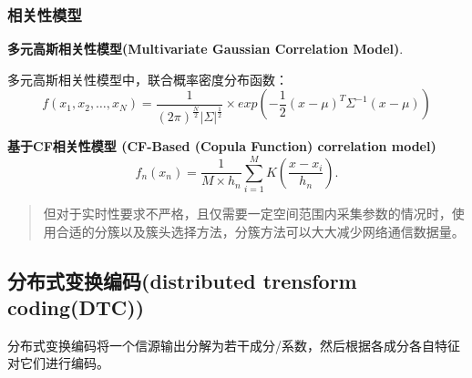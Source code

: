 \subsubsection{相关性模型}
\textbf{多元高斯相关性模型(Multivariate Gaussian Correlation Model)}.

多元高斯相关性模型中，联合概率密度分布函数：
\begin{equation}
    f(x_1,x_2,\dots,x_N) = \dfrac{1}{(2\pi)^{\frac{N}{2}}|\Sigma|^{\frac{1}{2}}} \times exp\left( -\dfrac{1}{2} (x-\mu)^T \Sigma^{-1}(x-\mu) \right)
    \label{eq1.4}
\end{equation}

\textbf{基于CF相关性模型 (CF-Based (Copula Function) correlation model)}
\begin{equation}
    f_n(x_n) = \dfrac{1}{M \times h_n} \sum_{i=1}^{M}K\left( \dfrac{x-x_i}{h_n} \right).
    \label{eq1.11}
\end{equation}




\begin{quote}
    但对于实时性要求不严格，且仅需要一定空间范围内采集参数的情况时，使用合适的分簇以及簇头选择方法，分簇方法可以大大减少网络通信数据量。
\end{quote}

\subsection{分布式变换编码(distributed trensform coding(DTC))}

分布式变换编码将一个信源输出分解为若干成分/系数，然后根据各成分各自特征对它们进行编码。
